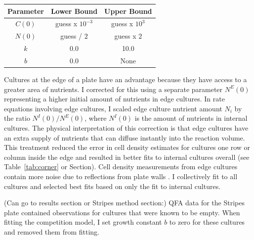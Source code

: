 \begin{center}
  \begin{tabular}{| c | c c |}
    \hline
    Parameter        & Lower Bound  & Upper Bound \\
    \hline
    \(C(0)\)     & guess x \(10^{-3}\)  & guess x \(10^{3}\)\\
    \(N(0)\)     & guess / \(2\)  & guess x \(2\)\\
    \(k\)        & 0.0    & 10.0\\
    \(b\)           & 0.0    & None \\
    \hline
  \end{tabular}
  \label{tab:p15_bounds}
\end{center}
%
Cultures at the edge of a plate have an advantage because they have
access to a greater area of nutrients. I corrected for this using a
separate parameter \(N^{E}(0)\) representing a higher initial
amount of nutrients in edge cultures. In rate equations involving edge
cultures, I scaled edge culture nutrient amount \(N_{i}\) by the ratio
\(N^{I}(0)/N^{E}(0)\), where \(N^{I}(0)\) is the amount
of nutrients in internal cultures. The physical interpretation of this
correction is that edge cultures have an extra supply of nutrients
that can diffuse instantly into the reaction volume. This treatment
reduced the error in cell density estimates for cultures one row or
column inside the edge and resulted in better fits to internal
cultures overall (see Table~\ref{tab:corner} or Section). Cell density
measurements from edge cultures contain more noise due to reflections
from plate walls \citep{Lawless2010}. I collectively fit to all
cultures and selected best fits based on only the fit to internal
cultures.

(Can go to results section or Stripes method section:) QFA data for
the Stripes plate contained observations for cultures that were known
to be empty. When fitting the competition model, I set growth constant
\(b\) to zero for these cultures and removed them from fitting.

